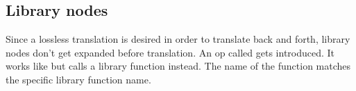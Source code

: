 \newpage
\subsection{Library nodes}
Since a lossless translation is desired in order to translate back and forth, library nodes don't get expanded before translation. An op called  gets introduced. It works like  but calls a library function instead. The name of the function matches the specific library function name.
